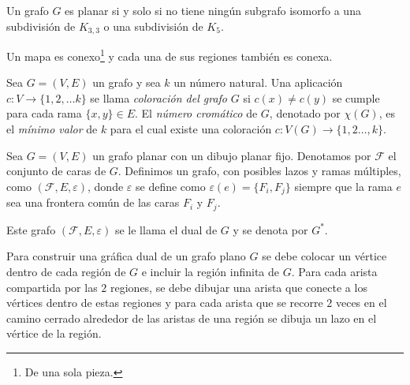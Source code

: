 \documentclass[
	3p,
	times,
	a4paper,
	authoryear
]{elsarticle}%
\begin{document}
\begin{theorem}

Un grafo $G$ es planar si y solo si no tiene ningún subgrafo isomorfo a una subdivisión de $K_{3,3}$ o una subdivisión de $K_5$.

\end{theorem}

\begin{definition}

Un mapa es conexo\footnote{De una sola pieza.} y cada una de sus regiones también es conexa.

\end{definition}

\begin{definition}

Sea $G=(V,E)$ un grafo y sea $k$ un número natural. Una aplicación $c\colon V\to \{1,2,\ldots k\}$ se llama \emph{\color{DarkBlue}coloración del grafo} $G$ si $c(x)\neq c(y)$ se cumple para cada rama $\{x,y\}\in E$. \linebreak El \emph{\color{DarkBlue}número cromático} de $G$, denotado por $\chi(G)$, es el \emph{\color{red}mínimo valor} de $k$ para el cual existe una coloración $c\colon V(G)\to\{1,2\ldots,k\}$.

\end{definition}

\begin{definition}

Sea $G=(V,E)$ un grafo planar con un dibujo planar fijo. Denotamos por $\mathcal{F}$ el conjunto de caras de $G$. Definimos un grafo, con posibles lazos y ramas múltiples, como $(\mathcal{F},E,\varepsilon)$, donde $\varepsilon$ se define como $\varepsilon(e)=\{F_i,F_j\}$ siempre que la rama $e$ sea una frontera común de las caras $F_i$ y $F_j$.

Este grafo $\left(\mathcal{F},E,\varepsilon\right)$ se le llama el dual de $G$ y se denota por $G^{\ast}$.
	
\end{definition}

\begin{example}

Para construir una gráfica dual de un grafo plano $G$ se debe colocar un vértice dentro de cada región de $G$ e incluir la región infinita de $G$. Para cada arista compartida por las $2$ regiones, se debe dibujar una arista que conecte a los vértices dentro de estas regiones y para cada arista que se recorre $2$ veces en el camino cerrado alrededor de las aristas de una región se dibuja un lazo en el vértice de la región.

\end{example}
\end{document}
